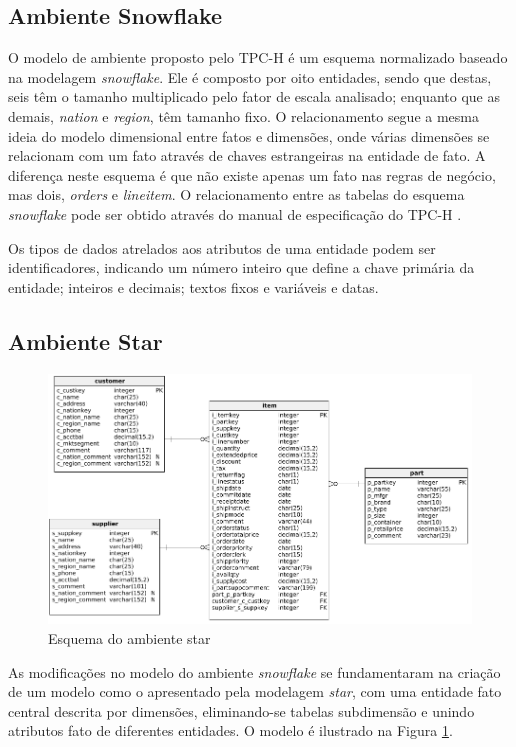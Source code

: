 \documentclass[conference]{IEEEtran}
\begin{document}
\subsection{Ambiente Snowflake}
\label{sec:snowflake}

O modelo de ambiente proposto pelo TPC-H é um esquema normalizado baseado na modelagem \textit{snowflake}. Ele é composto por oito entidades, sendo que destas, seis têm o tamanho multiplicado pelo fator de escala analisado; enquanto que as demais, \textit{nation} e \textit{region}, têm tamanho fixo. O relacionamento segue a mesma ideia do modelo dimensional entre fatos e dimensões, onde várias dimensões se relacionam com um fato através de chaves estrangeiras na entidade de fato. A diferença neste esquema é que não existe apenas um fato nas regras de negócio, mas dois, \textit{orders} e \textit{lineitem}. O relacionamento entre as tabelas do esquema \textit{snowflake} pode ser obtido através do manual de especificação do TPC-H \cite{tpc2017specs}.

Os tipos de dados atrelados aos atributos de uma entidade podem ser identificadores, indicando um número inteiro que define a chave primária da entidade; inteiros e decimais; textos fixos e variáveis e datas.

\subsection{Ambiente Star}
\label{sec:star}

\begin{figure}[htpb]
	\centering
		\includegraphics[width=\textwidth]{star}
	\caption{Esquema do ambiente star}
	\label{fig:star}
\end{figure}

As modificações no modelo do ambiente \textit{snowflake} se fundamentaram na criação de um modelo como o apresentado pela modelagem \textit{star}, com uma entidade fato central descrita por dimensões, eliminando-se tabelas subdimensão e unindo atributos fato de diferentes entidades. O modelo é ilustrado na Figura \ref{fig:star}.
 
\end{document}
